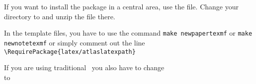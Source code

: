 If you want to install the package in a central area, use the  file.
Change your directory to  and unzip the file there.


In the template files, you have to use the command
\texttt{make newpapertexmf} or \texttt{make newnotetexmf} or simply comment out the line
\verb|\RequirePackage{latex/atlaslatexpath}|

If you are using traditional \BibTeX\ you also have to change\\
\verb|| to\\
\verb||

